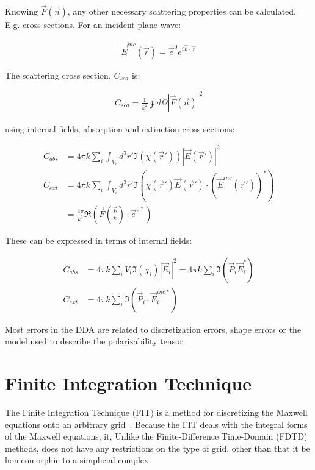     Knowing $\vec{F}(\vec{n})$, any other necessary scattering properties can be calculated. E.g. cross sections. For
    an incident plane wave:

    \begin{align}
        \vec{E}^{inc}(\vec{r}) = \vec{e}^0 e^{i\vec{k}\cdot\vec{r}}
    \end{align}

    The scattering cross section, $C_{sca}$ is:

    \begin{align}
        C_{sca} = \frac{1}{k^2}\oint d\Omega \left|\vec{F}(\vec{n})\right|^2
    \end{align}

    using internal fields, absorption and extinction cross sections:

    \begin{align}
        C_{abs} &= 4\pi k \sum_i \int_{V_i} d^3r' \Im(\chi(\vec{r}'))\left|\vec{E}(\vec{r}')\right|^2\\
        C_{ext} &= 4\pi k \sum_i \int_{V_i} d^3r' \Im\left(\chi(\vec{r}')\vec{E}(\vec{r}')\cdot(\vec{E}^{inc}(\vec{r}'))^*\right) \\
        &= \frac{4\pi}{k^2}\Re\left(\vec{F}(\frac{\vec{k}}{k})\cdot\vec{e}^{0*}\right)
    \end{align}

    These can be expressed in terms of internal fields:

    \begin{align}
        C_{abs} &= 4\pi k \sum_i V_i \Im(\chi_i)|\vec{E}_i|^2 = 4\pi k \sum_i \Im(\vec{P}_i\vec{E}_i^*) \\
        C_{ext} &= 4\pi k \sum_i \Im (\vec{P}_i\cdot\vec{E}_i^{inc*})
    \end{align}

    Most errors in the DDA are related to discretization errors, shape errors or the model used to describe the polarizability tensor.



\section{Finite Integration Technique}
\label{ap:FIT}
    The Finite Integration Technique (FIT) is a method for discretizing the Maxwell equations onto an arbitrary
    grid~\cite{weiland2001discrete}.  Because the FIT deals with the integral forms of the Maxwell equations, it,
    Unlike the Finite-Difference Time-Domain (FDTD) methods, does not have any restrictions on the type of grid,
    other than that it be homeomorphic to a simplicial complex.

